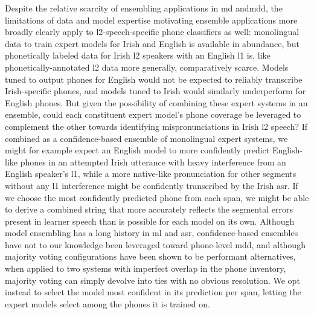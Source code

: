 \documentclass[thesis]{cluu}
\begin{document}
Despite the relative scarcity of ensembling applications in \gls{md} and\gls{mdd}, the limitations of data and model expertise motivating ensemble applications more broadly clearly apply to \gls{l2}-speech-specific phone classifiers as well: monolingual data to train expert models for Irish and English is available in abundance, but phonetically labeled data for Irish \gls{l2} speakers with an English \gls{l1} is, like phonetically-annotated \gls{l2} data more generally, comparatively scarce. Models tuned to output phones for English would not be expected to reliably transcribe Irish-specific phones, and models tuned to Irish would similarly underperform for English phones. But given the possibility of combining these expert systems in an ensemble, could each constituent expert model's phone coverage be leveraged to complement the other towards identifying mispronunciations in Irish \gls{l2} speech? If combined as a confidence-based ensemble of monolingual expert systems, we might for example expect an English model to more confidently predict English-like phones in an attempted Irish utterance with heavy interference from an English speaker's \gls{l1}, while a more native-like pronunciation for other segments without any \gls{l1} interference might be confidently transcribed by the Irish \gls{asr}. If we choose the most confidently predicted phone from each span, we might be able to derive a combined string that more accurately reflects the segmental errors present in learner speech than is possible for each model on its own. Although model ensembling has a long history in \gls{ml} and \gls{asr}, confidence-based ensembles have not to our knowledge been leveraged toward phone-level \gls{mdd}, and although majority voting configurations have been shown to be performant alternatives, when applied to two systems with imperfect overlap in the phone inventory, majority voting can simply devolve into ties with no obvious resolution. We opt instead to select the model most confident in its prediction per span, letting the expert models select among the phones it is trained on.
\end{document}
